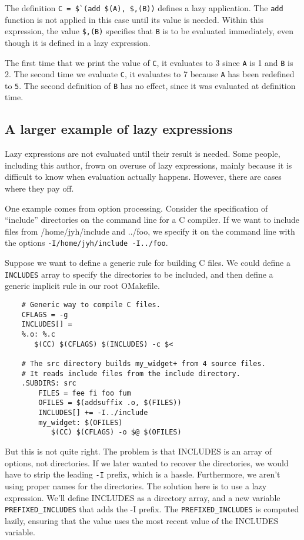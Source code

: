 The definition \verb+C = $`(add $(A), $,(B))+ defines a lazy application.
The \verb+add+ function is not applied in this case until its value is needed.
Within this expression, the value \verb+$,(B)+ specifies that \verb+B+ is
to be evaluated immediately, even though it is defined in a lazy expression.

The first time that we print the value of \verb+C+, it evaluates to 3
since \verb+A+ is 1 and \verb+B+ is 2.  The second time we evaluate \verb+C+,
it evaluates to 7 because \verb+A+ has been redefined to \verb+5+.  The second
definition of \verb+B+ has no effect, since it was evaluated at definition time.

\subsection{A larger example of lazy expressions}

Lazy expressions are not evaluated until their result is needed.  Some people,
including this author, frown on overuse of lazy expressions, mainly because it is difficult to know
when evaluation actually happens.  However, there are cases where they pay off.

One example comes from option processing.  Consider the specification of ``include'' directories on
the command line for a C compiler.  If we want to include files from /home/jyh/include and ../foo,
we specify it on the command line with the options \verb+-I/home/jyh/include -I../foo+.

Suppose we want to define a generic rule for building C files.  We could define a \verb+INCLUDES+
array to specify the directories to be included, and then define a generic implicit rule in our root
OMakefile.

\begin{verbatim}
    # Generic way to compile C files.
    CFLAGS = -g
    INCLUDES[] =
    %.o: %.c
       $(CC) $(CFLAGS) $(INCLUDES) -c $<

    # The src directory builds my_widget+ from 4 source files.
    # It reads include files from the include directory.
    .SUBDIRS: src
        FILES = fee fi foo fum
        OFILES = $(addsuffix .o, $(FILES))
        INCLUDES[] += -I../include
        my_widget: $(OFILES)
           $(CC) $(CFLAGS) -o $@ $(OFILES)
\end{verbatim}

But this is not quite right.  The problem is that INCLUDES is an array of options, not directories.
If we later wanted to recover the directories, we would have to strip the leading \verb+-I+ prefix,
which is a hassle.  Furthermore, we aren't using proper names for the directories.  The solution
here is to use a lazy expression.  We'll define INCLUDES as a directory array, and a new variable
\verb+PREFIXED_INCLUDES+ that adds the -I prefix.  The \verb+PREFIXED_INCLUDES+ is computed lazily,
ensuring that the value uses the most recent value of the INCLUDES variable.

